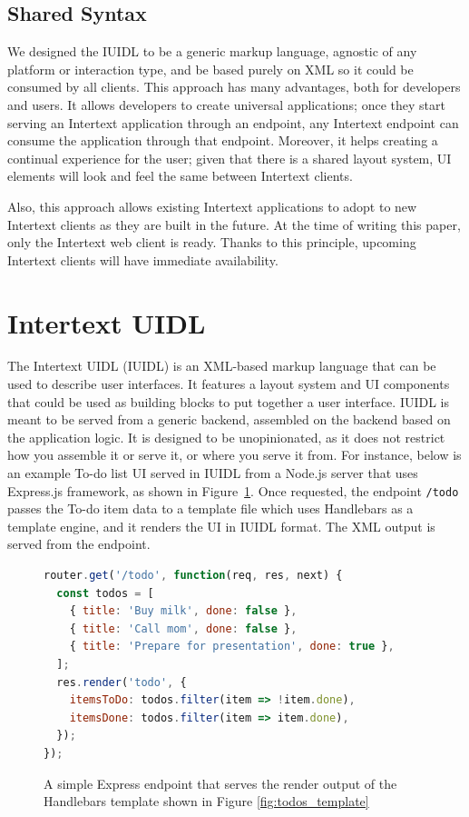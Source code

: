 \subsection{Shared Syntax}

We designed the IUIDL to be a generic markup language, agnostic of any platform or interaction type, and be based purely on XML so it could be consumed by all clients. This approach has many advantages, both for developers and users. It allows developers to create universal applications; once they start serving an Intertext application through an endpoint, any Intertext endpoint can consume the application through that endpoint. Moreover, it helps creating a continual experience for the user; given that there is a shared layout system, UI elements will look and feel the same between Intertext clients.

Also, this approach allows existing Intertext applications to adopt to new Intertext clients as they are built in the future. At the time of writing this paper, only the Intertext web client is ready. Thanks to this principle, upcoming Intertext clients will have immediate availability.

\section{Intertext UIDL} \label{intertextUIDL}

The Intertext UIDL (IUIDL) is an XML-based markup language that can be used to describe user interfaces. It features a layout system and UI components that could be used as building blocks to put together a user interface. IUIDL is meant to be served from a generic backend, assembled on the backend based on the application logic. It is designed to be unopinionated, as it does not restrict how you assemble it or serve it, or where you serve it from. For instance, below is an example To-do list UI served in IUIDL from a Node.js server that uses Express.js framework, as shown in Figure~\ref{fig:todos_js}. Once requested, the endpoint \texttt{/todo} passes the To-do item data to a template file which uses Handlebars as a template engine, and it renders the UI in IUIDL format. The XML output is served from the endpoint.

\begin{figure}[htb]
\begin{minipage}{\linewidth}
\begin{lstlisting}[language=javascript]
router.get('/todo', function(req, res, next) {
  const todos = [
    { title: 'Buy milk', done: false },
    { title: 'Call mom', done: false },
    { title: 'Prepare for presentation', done: true },
  ];
  res.render('todo', {
    itemsToDo: todos.filter(item => !item.done),
    itemsDone: todos.filter(item => item.done),
  });
});
\end{lstlisting}
\end{minipage}
\caption{A simple Express endpoint that serves the render output of the Handlebars template shown in Figure \ref{fig:todos_template}}%
\label{fig:todos_js}%
\end{figure}

